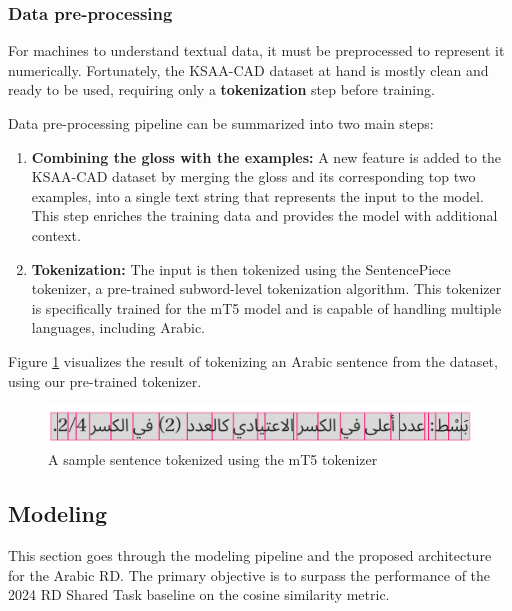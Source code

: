\documentclass[12pt]{article}
\begin{document}
\subsubsection{Data pre-processing}

For machines to understand textual data, it must be preprocessed to represent it numerically. Fortunately, the KSAA-CAD dataset at hand is mostly clean and ready to be used, requiring only a \textbf{tokenization} step before training.

Data pre-processing pipeline can be summarized into two main steps:

\begin{enumerate}
    \item \textbf{Combining the gloss with the examples:} A new feature is added to the KSAA-CAD dataset by merging the gloss and its corresponding top two examples, into a single text string that represents the input to the model. This step enriches the training data and provides the model with additional context.
    \item \textbf{Tokenization:} The input is then tokenized using the SentencePiece tokenizer, a pre-trained subword-level tokenization algorithm. This tokenizer is specifically trained for the mT5 model and is capable of handling multiple languages, including Arabic.
\end{enumerate}

Figure \ref{fig:tokenized-sentence} visualizes the result of tokenizing an Arabic sentence from the dataset, using our pre-trained tokenizer.

\begin{figure}[H]
    \centering
    \captionsetup{justification=centering}
    \includegraphics[width=\textwidth]{tokenized-sentence.png}
    \caption{A sample sentence tokenized using the mT5 tokenizer}
    \label{fig:tokenized-sentence}
\end{figure}

\subsection{Modeling}

This section goes through the modeling pipeline and the proposed architecture for the Arabic RD. The primary objective is to surpass the performance of the 2024 RD Shared Task baseline on the cosine similarity metric. 
\end{document}
